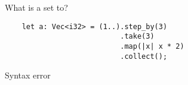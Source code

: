 %
%
  What is a set to?

  \begin{lstlisting}
    let a: Vec<i32> = (1..).step_by(3)
                           .take(3)
                           .map(|x| x * 2)
                           .collect();
  \end{lstlisting}

  \choice {[2, 4, 6]}
  \choice Syntax error
  \choice {[4, 10, 16]}
  \choice {[2. 8, 14]}
